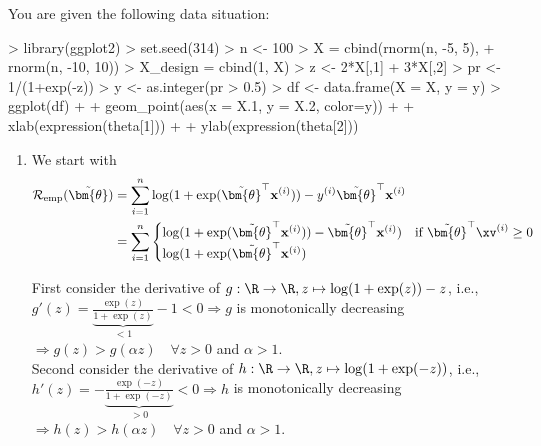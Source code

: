 You are given the following data situation:
\begin{Schunk}
\begin{Sinput}
> library(ggplot2)
> set.seed(314)
> n <- 100
> X = cbind(rnorm(n, -5, 5),
+   rnorm(n, -10, 10))
> X_design = cbind(1, X)
> z <- 2*X[,1] + 3*X[,2] 
> pr <- 1/(1+exp(-z))
> y <- as.integer(pr > 0.5)
> df <- data.frame(X = X, y = y)
> ggplot(df) +
+   geom_point(aes(x = X.1, y = X.2, color=y)) + 
+   xlab(expression(theta[1])) + 
+   ylab(expression(theta[2]))  
\end{Sinput}
\end{Schunk}

\begin{enumerate}
\item
We start with
\begin{align*}
  \mathcal{R}_\text{emp}(\tilde{\bm{\theta}}) &= \sum^n_{i=1} \log(1 + \exp(\tilde{\bm{\theta}}^\top \mathbf{x}^{(i)})) - y^{(i)}\tilde{\bm{\theta}}^\top \mathbf{x}^{(i)} \\
  &= \sum^n_{i=1} \begin{cases}
    \log(1 + \exp(\tilde{\bm{\theta}}^\top \mathbf{x}^{(i)})) - \tilde{\bm{\theta}}^\top \mathbf{x}^{(i)}) & \text{if $\tilde{\bm{\theta}}^\top \xv^{(i)} \geq 0$} \\
    \log(1 + \exp(\tilde{\bm{\theta}}^\top \mathbf{x}^{(i)})
  \end{cases}
\end{align*}

First consider the derivative of $g:\R \rightarrow \R, z\mapsto \log(1+\exp(z)) - z$, i.e.,\\
$g'(z) = \underbrace{\frac{\exp(z)}{1+\exp(z)}}_{< 1} - 1 < 0 \Rightarrow g$ is monotonically decreasing $\Rightarrow g(z) > g(\alpha z) \quad \forall z > 0$ and $\alpha > 1.$
\\
Second consider the derivative of $h:\R \rightarrow \R, z\mapsto \log(1+\exp(-z))$, i.e.,\\
$h'(z) = -\underbrace{\frac{\exp(-z)}{1+\exp(-z)}}_{>0} < 0 \Rightarrow h$ is monotonically decreasing $\Rightarrow h(z) > h(\alpha z) \quad \forall z > 0$ and $\alpha > 1.$


\end{enumerate}
